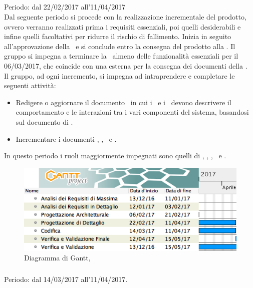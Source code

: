 \subsection{\PD}
Periodo: dal 22/02/2017 all'11/04/2017\\

Dal seguente periodo si procede con la realizzazione incrementale del prodotto, ovvero verranno realizzati prima i requisiti essenziali, poi quelli desiderabili e infine quelli facoltativi per ridurre il rischio di fallimento. 
Inizia in seguito all'approvazione della \PA\ e si conclude entro la consegna del prodotto alla \RQ.
Il gruppo si impegna a terminare la \PD\ almeno delle funzionalità essenziali per il 06/03/2017, che coincide con una  esterna per la consegna dei documenti della \RP.\\
Il gruppo, ad ogni incremento, si impegna ad intraprendere e completare le seguenti attività:
\begin{itemize}
\item
Redigere o aggiornare il documento \DDP\ in cui i \ProgrP\ e i \ProgP\ devono descrivere il comportamento e le interazioni tra i vari componenti del sistema, basandosi sul documento di \ST.
\item
Incrementare i documenti \NdP, \PdP, \PdQ\ e \Gl.
\end{itemize}
In questo periodo i ruoli maggiormente impegnati sono quelli di \Prog, \Progr, \Pm, \Ver\ e \Am.

 \begin{figure}[H]
	\centering 
	\includegraphics[scale=0.5]{Immagini/Gantt/PD.png}
	\caption{Diagramma di Gantt, \PD}
\end{figure}

\subsubsection{\COD}
Periodo: dal 14/03/2017 all'11/04/2017. \\

